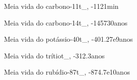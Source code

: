{Meia vida do carbono-11}{t_{, -11}}{21}{min}

{Meia vida do carbono-14}{t_{, -14}}{5730}{anos}

{Meia vida do potássio-40}{t_{, -40}}{1.27e9}{anos}

{Meia vida do trítio}{t_{, -3}}{12.3}{anos}

{Meia vida do rubídio-87}{t_{, -87}}{4.7e10}{anos}

%                                              
%                                              



\ExplSyntaxOn

%                                              
%                                              
